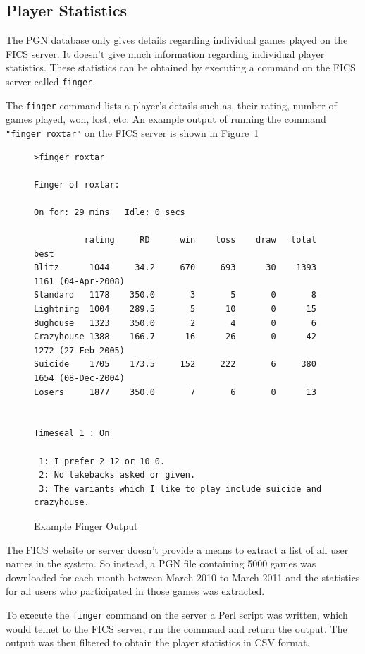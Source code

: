 \documentclass{article}
\begin{document}
\subsection{Player Statistics}
\label{sec:pstats}
The PGN database only gives details regarding individual games played on the FICS server. It doesn't give much information regarding individual player statistics. These statistics can be  obtained  by executing a command on the FICS server called \verb=finger=. 

The \verb=finger= command lists a player's details such as, their rating, number of games played, won, lost, etc. An example output of running the command \verb="finger roxtar"= on the FICS server is shown in Figure~\ref{fig:finger}

\begin{figure}[htp]
\begin{verbatim}
>finger roxtar

Finger of roxtar:

On for: 29 mins   Idle: 0 secs

          rating     RD      win    loss    draw   total   best
Blitz      1044     34.2     670     693      30    1393   1161 (04-Apr-2008)
Standard   1178    350.0       3       5       0       8
Lightning  1004    289.5       5      10       0      15
Bughouse   1323    350.0       2       4       0       6
Crazyhouse 1388    166.7      16      26       0      42   1272 (27-Feb-2005)
Suicide    1705    173.5     152     222       6     380   1654 (08-Dec-2004)
Losers     1877    350.0       7       6       0      13


Timeseal 1 : On

 1: I prefer 2 12 or 10 0.
 2: No takebacks asked or given.
 3: The variants which I like to play include suicide and crazyhouse.
\end{verbatim}
\caption{Example Finger Output}
\label{fig:finger}
\end{figure}

\pagebreak

The FICS website or server doesn't provide a means to extract a list of all user names in the system. So instead, a PGN file containing 5000 games was downloaded for each month between March 2010 to March 2011 and the statistics for all users who participated in those games was extracted. 

To execute the \verb=finger= command on the server a Perl script was written, which would telnet to the FICS server, run the command and return the output. The output was then filtered to obtain the player statistics in CSV format. \\
\end{document}
